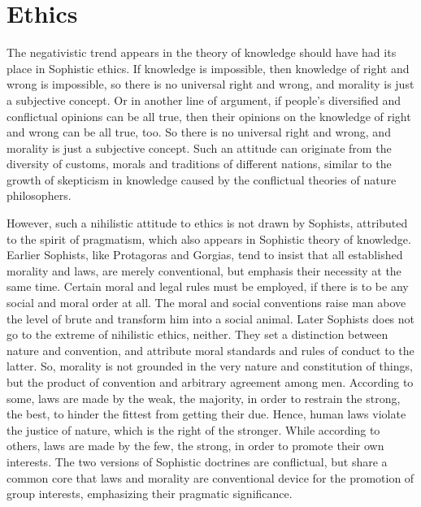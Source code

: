 \documentclass[11pt]{article}
\begin{document}
\begin{sloppypar}
\section{Ethics}
The negativistic trend appears in the theory of knowledge should have had its place in Sophistic ethics. 
If knowledge is impossible, then knowledge of right and wrong is impossible, so there is no universal right and wrong, and morality is just a subjective concept. 
Or in another line of argument, if people’s diversified and conflictual opinions can be all true, then their opinions on the knowledge of right and wrong can be all true, too. 
So there is no universal right and wrong, and morality is just a subjective concept. 
Such an attitude can originate from the diversity of customs, morals and traditions of different nations, similar to the growth of skepticism in knowledge caused by the conflictual theories of nature philosophers.

\par

However, such a nihilistic attitude to ethics is not drawn by Sophists, attributed to the spirit of pragmatism, which also appears in Sophistic theory of knowledge. 
Earlier Sophists, like Protagoras and Gorgias, tend to insist that all established morality and laws, are merely conventional, but emphasis their necessity at the same time. 
Certain moral and legal rules must be employed, if there is to be any social and moral order at all. 
The moral and social conventions raise man above the level of brute and transform him into a social animal. 
Later Sophists does not go to the extreme of nihilistic ethics, neither. 
They set a distinction between nature and convention, and attribute moral standards and rules of conduct to the latter. 
So, morality is not grounded in the very nature and constitution of things, but the product of convention and arbitrary agreement among men. 
According to some, laws are made by the weak, the majority, in order to restrain the strong, the best, to hinder the fittest from getting their due. 
Hence, human laws violate the justice of nature, which is the right of the stronger. 
While according to others, laws are made by the few, the strong, in order to promote their own interests. 
The two versions of Sophistic doctrines are conflictual, but share a common core that laws and morality are conventional device for the promotion of group interests, emphasizing their pragmatic significance.
\end{sloppypar}
\end{document}
